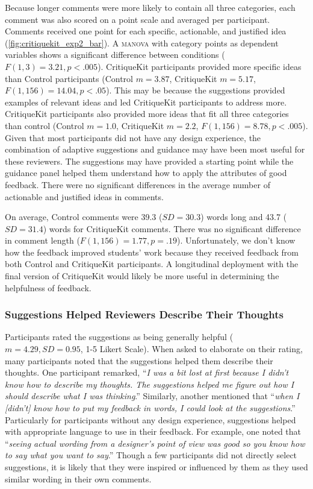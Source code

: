 Because longer comments were more likely to contain all three categories, each comment was also scored on a point scale and averaged per participant. Comments received one point for each specific, actionable, and justified idea (\autoref{fig:critiquekit_exp2_bar}). A \textsc{manova} with category points as dependent variables shows a significant difference between conditions ($F(1,3) = 3.21, p < .005$). CritiqueKit participants provided more specific ideas than Control participants (Control $m = 3.87$, CritiqueKit $m = 5.17$, $F(1,156) = 14.04, p  <  .05$). This may be because the suggestions provided examples of relevant ideas and led CritiqueKit participants to address more. CritiqueKit participants also provided more ideas that fit all three categories than control (Control $m = 1.0$, CritiqueKit $m = 2.2$, $F(1,156) = 8.78, p < .005$). Given that most participants did not have any design experience, the combination of adaptive suggestions and guidance may have been most useful for these reviewers. The suggestions may have provided a starting point while the guidance panel helped them understand how to apply the attributes of good feedback. There were no significant differences in the average number of actionable and justified ideas in comments.

On average, Control comments were 39.3 ($SD = 30.3$) words long and 43.7 ($SD = 31.4$) words for CritiqueKit comments. There was no significant difference in comment length ($F(1,156) = 1.77, p = .19$). Unfortunately, we don't know how the feedback improved students' work because they received feedback from both Control and CritiqueKit participants. A longitudinal deployment with the final version of CritiqueKit would likely be more useful in determining the helpfulness of feedback.

\subsubsection{Suggestions Helped Reviewers Describe Their Thoughts}
Participants rated the suggestions as being generally helpful ($m = 4.29, SD = 0.95$, 1-5 Likert Scale). When asked to elaborate on their rating, many participants noted that the suggestions helped them describe their thoughts. One participant remarked, ``\textit{I was a bit lost at first because I didn't know how to describe my thoughts. The suggestions helped me figure out how I should describe what I was thinking}.'' Similarly, another mentioned that ``\textit{when I [didn't] know how to put my feedback in words, I could look at the suggestions}.'' Particularly for participants without any design experience, suggestions helped with appropriate language to use in their feedback. For example, one noted that ``\textit{seeing actual wording from a designer's point of view was good so you know how to say what you want to say}.'' Though a few participants did not directly select suggestions, it is likely that they were inspired or influenced by them as they used similar wording in their own comments. 

